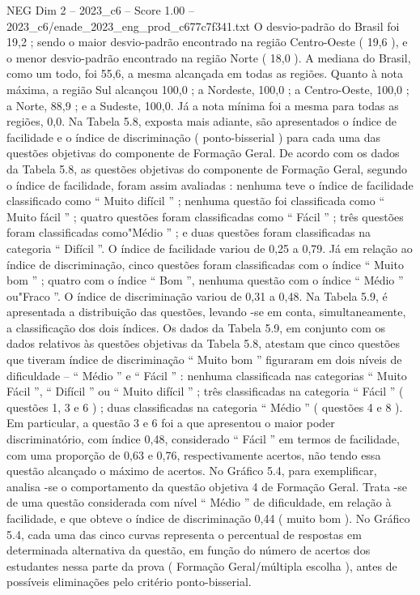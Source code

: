 \begin{textsample}{NEG Dim 2 – 2023\_c6 – Score 1.00 – 2023\_c6/enade\_2023\_eng\_prod\_c677c7f341.txt}
O desvio-padrão do Brasil foi 19,2 ; sendo o maior desvio-padrão encontrado na região Centro-Oeste ( 19,6 ), e o menor desvio-padrão encontrado na região Norte ( 18,0 ).
A mediana do Brasil, como um todo, foi 55,6, a mesma alcançada em todas as regiões.
Quanto à nota máxima, a região Sul alcançou 100,0 ; a Nordeste, 100,0 ; a Centro-Oeste, 100,0 ; a Norte, 88,9 ; e a Sudeste, 100,0.
Já a nota mínima foi a mesma para todas as regiões, 0,0.
Na Tabela 5.8, exposta mais adiante, são apresentados o índice de facilidade e o índice de discriminação ( ponto-bisserial ) para cada uma das questões objetivas do componente de Formação Geral.
De acordo com os dados da Tabela 5.8, as questões objetivas do componente de Formação Geral, segundo o índice de facilidade, foram assim avaliadas : nenhuma teve o índice de facilidade classificado como “ Muito difícil ” ; nenhuma questão foi classificada como “ Muito fácil ” ; quatro questões foram classificadas como “ Fácil ” ; três questões foram classificadas como"Médio ” ; e duas questões foram classificadas na categoria “ Difícil ”.
O índice de facilidade variou de 0,25 a 0,79.
Já em relação ao índice de discriminação, cinco questões foram classificadas com o índice “ Muito bom ” ; quatro com o índice “ Bom ”, nenhuma questão com o índice “ Médio ” ou"Fraco ”.
O índice de discriminação variou de 0,31 a 0,48.
Na Tabela 5.9, é apresentada a distribuição das questões, levando -se em conta, simultaneamente, a classificação dos dois índices.
Os dados da Tabela 5.9, em conjunto com os dados relativos às questões objetivas da Tabela 5.8, atestam que cinco questões que tiveram índice de discriminação “ Muito bom ” figuraram em dois níveis de dificuldade – “ Médio ” e “ Fácil ” : nenhuma classificada nas categorias “ Muito Fácil ”, “ Difícil ” ou “ Muito difícil ” ; três classificadas na categoria “ Fácil ” ( questões 1, 3 e 6 ) ; duas classificadas na categoria “ Médio ” ( questões 4 e 8 ).
Em particular, a questão 3 e 6 foi a que apresentou o maior poder discriminatório, com índice 0,48, considerado “ Fácil ” em termos de facilidade, com uma proporção de 0,63 e 0,76, respectivamente acertos, não tendo essa questão alcançado o máximo de acertos.
No Gráfico 5.4, para exemplificar, analisa -se o comportamento da questão objetiva 4 de Formação Geral.
Trata -se de uma questão considerada com nível “ Médio ” de dificuldade, em relação à facilidade, e que obteve o índice de discriminação 0,44 ( muito bom ).
No Gráfico 5.4, cada uma das cinco curvas representa o percentual de respostas em determinada alternativa da questão, em função do número de acertos dos estudantes nessa parte da prova ( Formação Geral/múltipla escolha ), antes de possíveis eliminações pelo critério ponto-bisserial.

\end{textsample}
